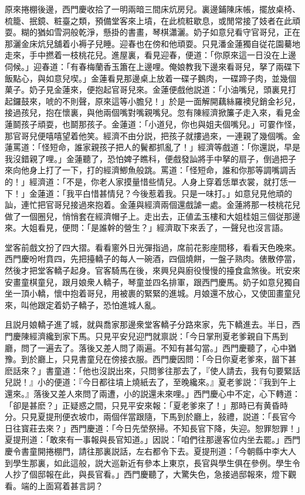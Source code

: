 原來捲棚後邊，西門慶收拾了一明兩暗三間床炕房兒。裏邊鋪陳床帳，擺放桌椅、梳籠、抿鏡、粧臺之類，預備堂客來上墳，在此梳粧歇息，或閒常接了妓者在此頑耍。糊的猶如雪洞般乾淨，懸掛的書畫，琴棋瀟灑。奶子如意兒看守官哥兒，正在那灑金床炕兒舖着小褥子兒睡。迎春也在傍和他頑耍。只見潘金蓮獨自従花園驀地走來，手中撚着一枝桃花兒。進屋裏，看見迎春，便道：「你原來這一日没在上邊伺候。」迎春道：「有春梅蘭香玉簫在上邊哩。俺娘教我下邊來看哥兒，拏了兩碟下飯點心，與如意兒喫。」金蓮看見那邊桌上放着一碟子鵝肉，一碟蹄子肉，並幾個菓子。奶子見金蓮來，便抱起官哥兒來。金蓮便戲他説道：「小油嘴兒，頭裏見打起鑼鼓來，唬的不則聲，原來這等小膽兒！」於是一面解開藕絲羅襖兒銷金衫兒，接過孩兒，抱在懷裏，與他兩個嘴對嘴親嘴兒。忽有陳經濟掀簾子走入來，看見金蓮鬬孩子頑耍，也鬬那孩子。金蓮道：「小道兒，你也與姐夫個嘴兒。」可霎作怪，那官哥兒便嘻嘻望着他笑。經濟不由分説，把孩子就摟過來，一連親了幾個嘴。金蓮罵道：「怪短命，誰家親孩子把人的鬢都抓亂了！」經濟等戲道：「你還説，早是我沒錯親了哩。」金蓮聽了，恐怕婢子瞧科，便戲發訕將手中拏的扇子，倒過把子來向他身上打了一下，打的經濟鯽魚般跳。罵道：「怪短命，誰和你那等調嘴調舌的！」經濟道：「不是，你老人家摸量惜些情兒。人身上穿着恁單衣裳，就打恁一下！」金蓮道：「我平白惜甚情兒？今後惹着我。只是一味打。」如意兒見他頑的訕，連忙把官哥兒接過來抱着。金蓮與經濟兩個還戲謔一處。金蓮將那一枝桃花兒做了一個圈兒，悄悄套在經濟帽子上。走出去，正値孟玉樓和大姐桂姐三個従那邊來。大姐看見，便問：「是誰幹的營生？」經濟取下來丢了，一聲兒也沒言語。

堂客前戲文扮了四大摺。看看窻外日光彈指過，席前花影座間移，看看天色晚來。西門慶吩咐賁四，先把擡轎子的每人一碗酒，四個燒餅，一盤子熟肉。俵散停當，然後才把堂客轎子起身。官客騎馬在後，來興兒與廚役慢慢的擡食盒煞後。玳安來安畫童棋童兒，跟月娘衆人轎子，琴童並四名排軍，跟西門慶馬。奶子如意兒獨自坐一頂小轎，懷中抱着哥兒，用被裹的緊緊的進城。月娘還不放心，又使囬畫童兒來，叫他跟定着奶子轎子，恐怕進城人亂。

且説月娘轎子進了城，就與喬家那邊衆堂客轎子分路來家，先下轎進去。半日，西門慶陳經濟纔到家下馬。只見平安兒迎門就禀説：「今日掌刑夏老爹親自下馬到廳，問了一遍去了。落後又差人問了兩遍。不知有甚勾當。」西門慶聽了，心中猶豫。到於廳上，只見書童兒在傍接衣服。西門慶因問：「今日你夏老爹來，㽞下甚麽話來？」書童道：「他也沒説出來，只問爹往那去了，『使人請去，我有句要緊話兒説！』小的便道：『今日都往墳上燒紙去了，至晚纔來。』夏老爹説：『我到午上還來。』落後又差人來問了兩遭，小的説還未來哩。」西門慶心中不定，心下轉道：「卻是甚麽？」正疑惑之間，只見平安來報：「夏老爹來了！」那時已有黄昏時分。只見夏提刑便衣坡巾，兩個伴當跟隨，下馬到於廳上，敍禮，説道：「長官今日往寳莊去來？」西門慶道：「今日先塋祭掃。不知長官下降，失迎。恕罪恕罪！」夏提刑道：「敢來有一事報與長官知道。」因説：「咱們往那邊客位内坐去罷。」西門慶令書童開捲棚門，請往那裏説話，左右都令下去。夏提刑道：「今朝縣中李大人到學生那裏，如此這般，説大巡新近有參本上東京，長官與學生俱在參例。學生令人抄了個邸報在此，與長官看。」西門慶聽了，大驚失色，急接過邸報來，燈下觀看。端的上面寫着甚言詞？

